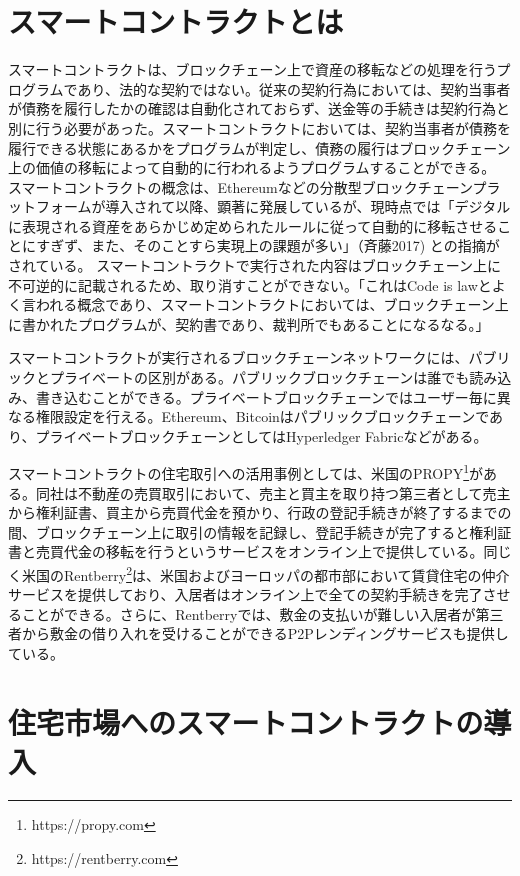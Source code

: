 \documentclass[a4paper,11pt]{jlreq}
\begin{document}
\section{スマートコントラクトとは}
スマートコントラクトは、ブロックチェーン上で資産の移転などの処理を行うプログラムであり、法的な契約ではない。従来の契約行為においては、契約当事者が債務を履行したかの確認は自動化されておらず、送金等の手続きは契約行為と別に行う必要があった。スマートコントラクトにおいては、契約当事者が債務を履行できる状態にあるかをプログラムが判定し、債務の履行はブロックチェーン上の価値の移転によって自動的に行われるようプログラムすることができる。
スマートコントラクトの概念は、Ethereumなどの分散型ブロックチェーンプラットフォームが導入されて以降、顕著に発展しているが、現時点では「デジタルに表現される資産をあらかじめ定められたルールに従って自動的に移転させることにすぎず、また、そのことすら実現上の課題が多い」（斉藤2017)
との指摘がされている。
スマートコントラクトで実行された内容はブロックチェーン上に不可逆的に記載されるため、取り消すことができない。「これはCode is lawとよく言われる概念であり、スマートコントラクトにおいては、ブロックチェーン上に書かれたプログラムが、契約書であり、裁判所でもあることになるなる。」


スマートコントラクトが実行されるブロックチェーンネットワークには、パブリックとプライベートの区別がある。パブリックブロックチェーンは誰でも読み込み、書き込むことができる。プライベートブロックチェーンではユーザー毎に異なる権限設定を行える。Ethereum、Bitcoinはパブリックブロックチェーンであり、プライベートブロックチェーンとしてはHyperledger Fabricなどがある。


スマートコントラクトの住宅取引への活用事例としては、米国のPROPY\footnote{https://propy.com}がある。同社は不動産の売買取引において、売主と買主を取り持つ第三者として売主から権利証書、買主から売買代金を預かり、行政の登記手続きが終了するまでの間、ブロックチェーン上に取引の情報を記録し、登記手続きが完了すると権利証書と売買代金の移転を行うというサービスをオンライン上で提供している。同じく米国のRentberry\footnote{https://rentberry.com}は、米国およびヨーロッパの都市部において賃貸住宅の仲介サービスを提供しており、入居者はオンライン上で全ての契約手続きを完了させることができる。さらに、Rentberryでは、敷金の支払いが難しい入居者が第三者から敷金の借り入れを受けることができるP2Pレンディングサービスも提供している。


\section{住宅市場へのスマートコントラクトの導入}
\end{document}
